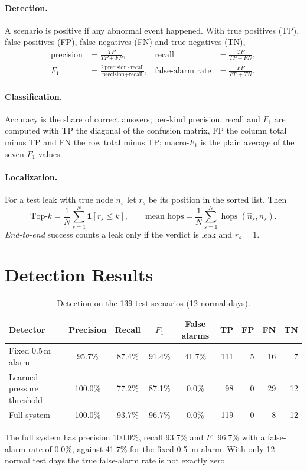 \documentclass[11pt,letterpaper]{report}
\theoremstyle{definition}
\theoremstyle{plain}
\theoremstyle{remark}
\begin{document}
\paragraph{Detection.} A scenario is positive if any abnormal event happened. With true positives (TP), false positives (FP), false negatives (FN) and true negatives (TN),
\begin{align}
\text{precision}&=\frac{TP}{TP+FP}, & \text{recall}&=\frac{TP}{TP+FN},\\
F_1&=\frac{2\,\text{precision}\cdot\text{recall}}{\text{precision}+\text{recall}}, & \text{false-alarm rate}&=\frac{FP}{FP+TN}.
\end{align}
\paragraph{Classification.} Accuracy is the share of correct answers; per-kind precision, recall and $F_1$ are computed with TP the diagonal of the confusion matrix, FP the column total minus TP and FN the row total minus TP; macro-$F_1$ is the plain average of the seven $F_1$ values.
\paragraph{Localization.} For a test leak with true node $n_s$ let $r_s$ be its position in the sorted list. Then
\begin{equation}
\text{Top-}k=\frac1N\sum_{s=1}^N\mathbf 1[r_s\le k],\qquad \text{mean hops}=\frac1N\sum_{s=1}^N\operatorname{hops}(\hat n_s,n_s).
\end{equation}
\emph{End-to-end} success counts a leak only if the verdict is leak and $r_s=1$.

\section{Detection Results}
\begin{table}[H]
\centering\small
\caption{Detection on the 139 test scenarios (12 normal days).}\label{tab:det}
\centering\footnotesize\setlength{\tabcolsep}{4pt}
\begin{tabular}{@{}lccccrrrr@{}}
\toprule
Detector & Precision & Recall & $F_1$ & False alarms & TP & FP & FN & TN \\
\midrule
Fixed 0.5\,m alarm & 95.7\% & 87.4\% & 91.4\% & 41.7\% & 111 & 5 & 16 & 7 \\
Learned pressure threshold & 100.0\% & 77.2\% & 87.1\% & 0.0\% & 98 & 0 & 29 & 12 \\
Full system & 100.0\% & 93.7\% & 96.7\% & 0.0\% & 119 & 0 & 8 & 12 \\
\bottomrule
\end{tabular}
\end{table}
The full system has precision 100.0\%, recall 93.7\% and $F_1$ 96.7\% with a false-alarm rate of 0.0\%, against 41.7\% for the fixed 0.5~m alarm. With only 12 normal test days the true false-alarm rate is not exactly zero.
\end{document}
